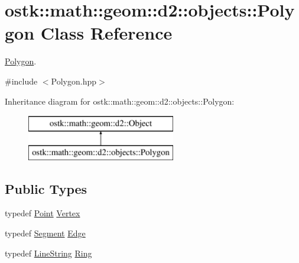 \hypertarget{classostk_1_1math_1_1geom_1_1d2_1_1objects_1_1_polygon}{}\section{ostk\+:\+:math\+:\+:geom\+:\+:d2\+:\+:objects\+:\+:Polygon Class Reference}
\label{classostk_1_1math_1_1geom_1_1d2_1_1objects_1_1_polygon}


\hyperlink{classostk_1_1math_1_1geom_1_1d2_1_1objects_1_1_polygon}{Polygon}.  




{\ttfamily \#include $<$Polygon.\+hpp$>$}

Inheritance diagram for ostk\+:\+:math\+:\+:geom\+:\+:d2\+:\+:objects\+:\+:Polygon\+:\begin{figure}[H]
\begin{center}
\leavevmode
\includegraphics[height=2.000000cm]{classostk_1_1math_1_1geom_1_1d2_1_1objects_1_1_polygon}
\end{center}
\end{figure}
\subsection*{Public Types}
\begin{DoxyCompactItemize}
\item 
typedef \hyperlink{classostk_1_1math_1_1geom_1_1d2_1_1objects_1_1_point}{Point} \hyperlink{classostk_1_1math_1_1geom_1_1d2_1_1objects_1_1_polygon_a2fdf6254b42f087bd9cd0b8b0d7df91c}{Vertex}
\item 
typedef \hyperlink{classostk_1_1math_1_1geom_1_1d2_1_1objects_1_1_segment}{Segment} \hyperlink{classostk_1_1math_1_1geom_1_1d2_1_1objects_1_1_polygon_a85e5c92944c126a62464874b5a6ba490}{Edge}
\item 
typedef \hyperlink{classostk_1_1math_1_1geom_1_1d2_1_1objects_1_1_line_string}{Line\+String} \hyperlink{classostk_1_1math_1_1geom_1_1d2_1_1objects_1_1_polygon_a2cfc117e0bd669946a670640eae4ee4c}{Ring}
\end{DoxyCompactItemize}
